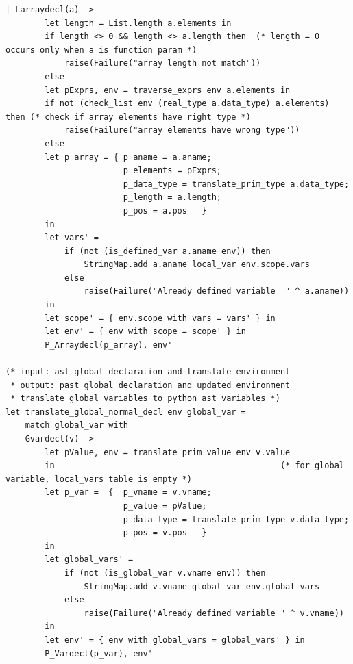 \documentclass[12pt]{article} %
\begin{document}
\begin{lstlisting}[style=appendix, caption=translate.ml]
    | Larraydecl(a) -> 
        let length = List.length a.elements in
        if length <> 0 && length <> a.length then  (* length = 0 occurs only when a is function param *)
            raise(Failure("array length not match"))
        else
        let pExprs, env = traverse_exprs env a.elements in
        if not (check_list env (real_type a.data_type) a.elements) then (* check if array elements have right type *)
            raise(Failure("array elements have wrong type"))
        else
        let p_array = { p_aname = a.aname; 
                        p_elements = pExprs;
                        p_data_type = translate_prim_type a.data_type; 
                        p_length = a.length;
                        p_pos = a.pos   } 
        in
        let vars' = 
            if (not (is_defined_var a.aname env)) then
                StringMap.add a.aname local_var env.scope.vars
            else
                raise(Failure("Already defined variable  " ^ a.aname))
        in
        let scope' = { env.scope with vars = vars' } in
        let env' = { env with scope = scope' } in
        P_Arraydecl(p_array), env'

(* input: ast global declaration and translate environment
 * output: past global declaration and updated environment
 * translate global variables to python ast variables *)
let translate_global_normal_decl env global_var = 
    match global_var with
    Gvardecl(v) ->
        let pValue, env = translate_prim_value env v.value 
        in                                              (* for global variable, local_vars table is empty *)
        let p_var =  {  p_vname = v.vname; 
                        p_value = pValue; 
                        p_data_type = translate_prim_type v.data_type; 
                        p_pos = v.pos   } 
        in
        let global_vars' = 
            if (not (is_global_var v.vname env)) then
                StringMap.add v.vname global_var env.global_vars
            else
                raise(Failure("Already defined variable " ^ v.vname))
        in
        let env' = { env with global_vars = global_vars' } in 
        P_Vardecl(p_var), env'
           

\end{lstlisting}
\end{document}
